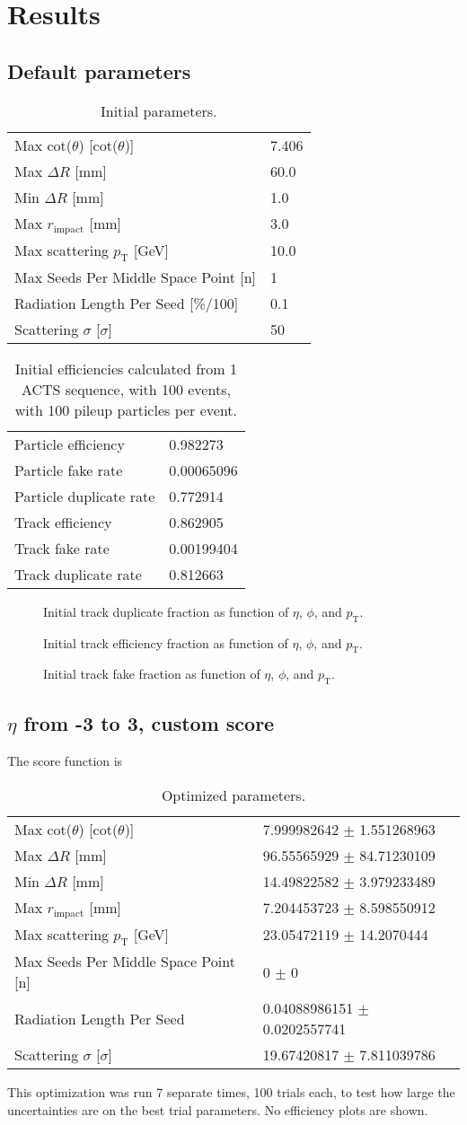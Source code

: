 \documentclass{article}
\newcommand{\pic}[2]{\beg{center}{\texttt{[image: \#2]}}}
\newcommand{\figpic}[3]{
\begin{figure}[H]
\begin{center}
\pic{#1}{#2}
\caption{#3}
\end{center}
\end{figure}}
\newcommand{\pt}[0]{p_\textrm{T}}
\newcommand{\figtab}[3]{
\begin{table}[H]
\begin{tabular}{#1}
#2
\end{tabular}
\caption{#3}
\end{table}}
\begin{document}
\section{Results}
\subsection{Default parameters}
\figtab{l l}{Max \textrm{cot}($\theta$) [\textrm{cot}($\theta$)] & 7.406\\
Max $\Delta R$ [mm] & 60.0\\
Min $\Delta R$ [mm]  & 1.0\\
Max $r_\textrm{impact}$ [mm] & 3.0\\
Max scattering $\pt$ [GeV] & 10.0\\
Max Seeds Per Middle Space Point [n] & 1\\
Radiation Length Per Seed [\%/100] & 0.1\\
Scattering $\sigma$ [$\sigma$] & 50
}{\label{192837a}Initial parameters.}
\figtab{l l}{
Particle efficiency &0.982273\\
Particle fake rate &0.00065096\\
Particle duplicate rate &0.772914\\
Track efficiency &0.862905\\
Track fake rate &0.00199404\\
Track duplicate rate &0.812663
}{Initial efficiencies calculated from 1 ACTS sequence, with 100 events, with 100 pileup particles per event.}
\figpic{3.5cm}{/home/user1/time/2023-02-23/2023-02-23-11-14/single/dup.png}{Initial track duplicate fraction as function of $\eta$, $\phi$, and $\pt$.}
\figpic{3.5cm}{/home/user1/time/2023-02-23/2023-02-23-11-14/single/eff.png}{Initial track efficiency fraction as function of $\eta$, $\phi$, and $\pt$.}
\figpic{3.5cm}{/home/user1/time/2023-02-23/2023-02-23-11-14/single/fak.png}{Initial track fake fraction as function of $\eta$, $\phi$, and $\pt$.}
\subsection{$\eta$ from -3 to 3, custom score}
The score function is
\figtab{l l}{
Max \textrm{cot}($\theta$) [\textrm{cot}($\theta$)] & 7.999982642 $\pm$ 1.551268963\\
Max $\Delta R$ [mm] & 96.55565929 $\pm$ 84.71230109\\
Min $\Delta R$ [mm]  & 14.49822582 $\pm$ 3.979233489\\
Max $r_\textrm{impact}$ [mm] & 7.204453723 $\pm$ 8.598550912\\
Max scattering $p_{\textrm{T}}$ [GeV] & 23.05472119 $\pm$ 14.2070444\\
Max Seeds Per Middle Space Point [n] & 0 $\pm$ 0\\
Radiation Length Per Seed & 0.04088986151 $\pm$ 0.0202557741\\
Scattering $\sigma$ [$\sigma$] & 19.67420817 $\pm$ 7.811039786\\
}{Optimized parameters.}
This optimization was run 7 separate times, 100 trials each, to test how large the uncertainties are on the best trial parameters. No efficiency plots are shown.
\end{document}
